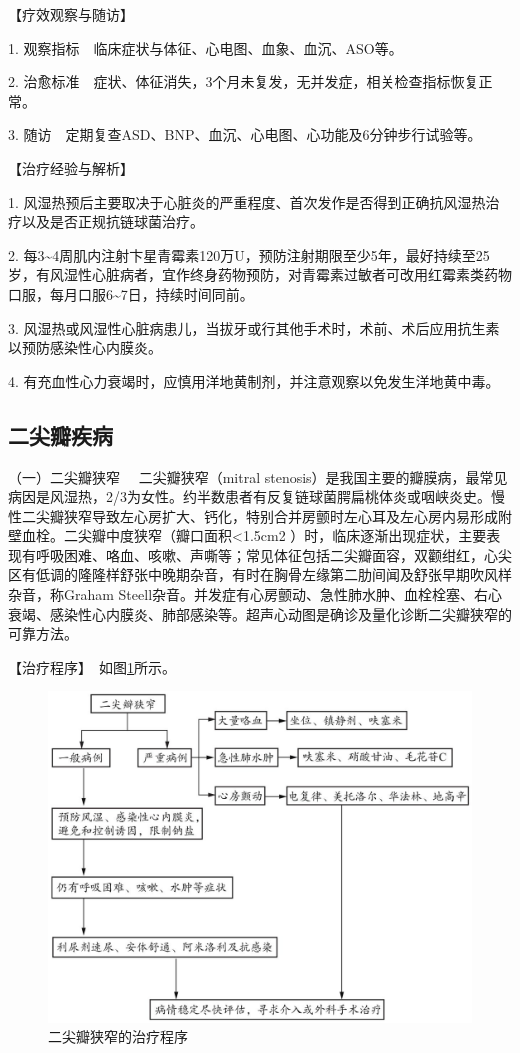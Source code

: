 【疗效观察与随访】

1. 观察指标　临床症状与体征、心电图、血象、血沉、ASO等。

2.
治愈标准　症状、体征消失，3个月未复发，无并发症，相关检查指标恢复正常。

3. 随访　定期复查ASD、BNP、血沉、心电图、心功能及6分钟步行试验等。

【治疗经验与解析】

1.
风湿热预后主要取决于心脏炎的严重程度、首次发作是否得到正确抗风湿热治疗以及是否正规抗链球菌治疗。

2.
每3\textasciitilde{}4周肌内注射卞星青霉素120万U，预防注射期限至少5年，最好持续至25岁，有风湿性心脏病者，宜作终身药物预防，对青霉素过敏者可改用红霉素类药物口服，每月口服6\textasciitilde{}7日，持续时间同前。

3.
风湿热或风湿性心脏病患儿，当拔牙或行其他手术时，术前、术后应用抗生素以预防感染性心内膜炎。

4. 有充血性心力衰竭时，应慎用洋地黄制剂，并注意观察以免发生洋地黄中毒。

\subsection{二尖瓣疾病}

{（一）二尖瓣狭窄} 　二尖瓣狭窄（mitral
stenosis）是我国主要的瓣膜病，最常见病因是风湿热，2/3为女性。约半数患者有反复链球菌腭扁桃体炎或咽峡炎史。慢性二尖瓣狭窄导致左心房扩大、钙化，特别合并房颤时左心耳及左心房内易形成附壁血栓。二尖瓣中度狭窄（瓣口面积\textless{}1.5cm{2}
）时，临床逐渐出现症状，主要表现有呼吸困难、咯血、咳嗽、声嘶等；常见体征包括二尖瓣面容，双颧绀红，心尖区有低调的隆隆样舒张中晚期杂音，有时在胸骨左缘第二肋间闻及舒张早期吹风样杂音，称Graham
Steell杂音。并发症有心房颤动、急性肺水肿、血栓栓塞、右心衰竭、感染性心内膜炎、肺部感染等。超声心动图是确诊及量化诊断二尖瓣狭窄的可靠方法。

【治疗程序】　如图\ref{fig2-8-1}所示。

\begin{figure}[!htbp]
 \centering
 \includegraphics{./images/Image00076.jpg}
 \captionsetup{justification=centering}
 \caption{二尖瓣狭窄的治疗程序}
 \label{fig2-8-1}
  \end{figure} 

